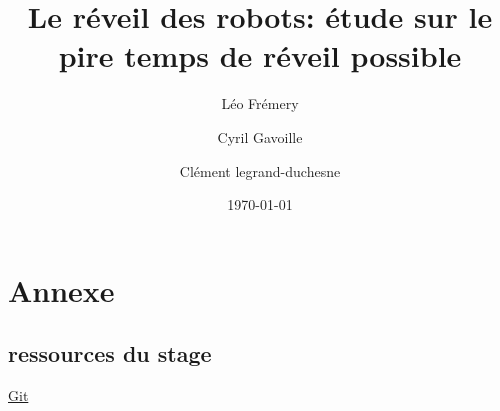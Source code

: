 \documentclass[titlepage, a4paper, 12pt]{article}
\title{Le réveil des robots: étude sur le pire temps de réveil possible}
\date{\today}
\author{Léo Frémery \and Cyril Gavoille \and Clément legrand-duchesne}
\begin{document}
	\maketitle
	
	\tableofcontents
	
	\newpage
	
	

	
	
	
	
	
	
	\section{Annexe}
	
	
	
	\subsection{ressources du stage}
	
	\href{https://github.com/lum33n/freeze-tag-internship/tree/main}{Git}
\end{document}
